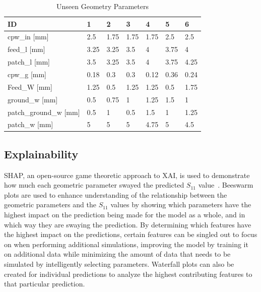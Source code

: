 \documentclass[conference]{IEEEtran}
\begin{document}
\begin{table}[h]
\caption{Unseen Geometry Parameters}
\begin{center}
\begin{tabular}{ |l|l|l|l|l|l|l| }
    \hline
    ID & 1 & 2 & 3 & 4 & 5 & 6 \\
    \hline
    cpw\_in [mm] & 2.5 & 1.75 & 1.75 & 1.75 & 2.5 & 2.5 \\
    \hline
    feed\_l [mm] & 3.25 & 3.25 & 3.5 & 4 & 3.75 & 4 \\
    \hline
    patch\_l [mm] & 3.5 & 3.25 & 3.5 & 4 & 3.75 & 4.25 \\
    \hline
    cpw\_g [mm] & 0.18 & 0.3 & 0.3 & 0.12 & 0.36 & 0.24 \\
    \hline
    Feed\_W [mm] & 1.25 & 0.5 & 1.25 & 1.25 & 0.5 & 1.75 \\
    \hline
    ground\_w [mm] & 0.5 & 0.75 & 1 & 1.25 & 1.5 & 1 \\
    \hline
    patch\_ground\_w [mm] & 0.5 & 1 & 0.5 & 1.5 & 1 & 1.25 \\
    \hline
    patch\_w [mm] & 5 & 5 & 5 & 4.75 & 5 & 4.5 \\
    \hline
\end{tabular}
\end{center}
\label{unseen_geometries_lw}
\end{table}    
    



\subsection{Explainability}
SHAP, an open-source game theoretic approach to XAI, is used to demonstrate how much each geometric parameter swayed the predicted $S_{11}$ value~\cite{NIPS2017_7062}. Beeswarm plots are used to enhance understanding of the relationship between the geometric parameters and the $S_{11}$ values by showing which parameters have the highest impact on the prediction being made for the model as a whole, and in which way they are swaying the prediction. By determining which features have the highest impact on the predictions, certain features can be singled out to focus on when performing additional simulations, improving the model by training it on additional data while minimizing the amount of data that needs to be simulated by intelligently selecting parameters. Waterfall plots can also be created for individual predictions to analyze the highest contributing features to that particular prediction.
\end{document}
